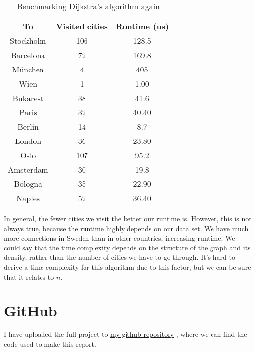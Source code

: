 \documentclass[a4paper,11pt]{article}
\newcommand{\underlinehref}[2]{%
    \href{#1}{\ul{#2}}%
}
\begin{document}
    \begin{table}[H]
        \begin{center}
            \begin{tabular}{c|c|c}
                \textbf{To} & \textbf{Visited cities} & \textbf{Runtime (us)}\\
                \hline
                Stockholm     &  106 &     128.5\\
                Barcelona    &  72 &     169.8\\
                München   &  4 &     405\\
                Wien    &  1 &     1.00\\
                Bukarest    &  38 &     41.6\\
                Paris    &  32 &     40.40\\
                Berlin    &  14 &     8.7\\
                London    &  36 &     23.80\\
                Oslo    &  107 &     95.2\\
                Amsterdam    &  30 &     19.8\\
                Bologna    &  35 &     22.90\\
                Naples    &  52 &     36.40\\
            \end{tabular}
            \caption{Benchmarking Dijkstra's algorithm again}
            \label{tab:table2}
        \end{center}
    \end{table}

    In general, the fewer cities we visit the better our runtime is.
    However, this is not always true, because the runtime highly depends on our data set.
    We have much more connections in Sweden than in other countries, increasing runtime.
    We could say that the time complexity depends on the structure of the graph and its density, rather than the number of cities we have to go through.
    It's hard to derive a time complexity for this algorithm due to this factor, but we can be sure that it relates to $n$.

    \section*{GitHub}
    I have uploaded the full project to \underlinehref{https://github.com/peterherczku/ID1021/tree/main/assignment-9-A}{my github repository}, where we can find the code used to make this report.
\end{document}
